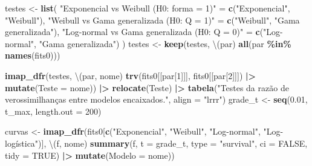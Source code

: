 \documentclass[
  brazilian,
]{article}
\newenvironment{Shaded}{\begin{snugshade}}{\end{snugshade}}
\newcommand{\AttributeTok}[1]{\textcolor[rgb]{0.13,0.29,0.53}{#1}}
\newcommand{\ConstantTok}[1]{\textcolor[rgb]{0.56,0.35,0.01}{#1}}
\newcommand{\DecValTok}[1]{\textcolor[rgb]{0.00,0.00,0.81}{#1}}
\newcommand{\FloatTok}[1]{\textcolor[rgb]{0.00,0.00,0.81}{#1}}
\newcommand{\FunctionTok}[1]{\textcolor[rgb]{0.13,0.29,0.53}{\textbf{#1}}}
\newcommand{\NormalTok}[1]{#1}
\newcommand{\OtherTok}[1]{\textcolor[rgb]{0.56,0.35,0.01}{#1}}
\newcommand{\SpecialCharTok}[1]{\textcolor[rgb]{0.81,0.36,0.00}{\textbf{#1}}}
\newcommand{\StringTok}[1]{\textcolor[rgb]{0.31,0.60,0.02}{#1}}
\begin{document}
\begin{Shaded}
\begin{Highlighting}[]
\NormalTok{testes }\OtherTok{\textless{}{-}} \FunctionTok{list}\NormalTok{(}
  \StringTok{"Exponencial vs Weibull (H0: forma = 1)"} \OtherTok{=} \FunctionTok{c}\NormalTok{(}\StringTok{"Exponencial"}\NormalTok{, }\StringTok{"Weibull"}\NormalTok{),}
  \StringTok{"Weibull vs Gama generalizada (H0: Q = 1)"} \OtherTok{=} \FunctionTok{c}\NormalTok{(}\StringTok{"Weibull"}\NormalTok{, }\StringTok{"Gama generalizada"}\NormalTok{),}
  \StringTok{"Log{-}normal vs Gama generalizada (H0: Q = 0)"} \OtherTok{=} \FunctionTok{c}\NormalTok{(}\StringTok{"Log{-}normal"}\NormalTok{, }\StringTok{"Gama generalizada"}\NormalTok{)}
\NormalTok{)}
\NormalTok{testes }\OtherTok{\textless{}{-}} \FunctionTok{keep}\NormalTok{(testes, \textbackslash{}(par) }\FunctionTok{all}\NormalTok{(par }\SpecialCharTok{\%in\%} \FunctionTok{names}\NormalTok{(fits0)))}

\FunctionTok{imap\_dfr}\NormalTok{(testes, \textbackslash{}(par, nome) }\FunctionTok{trv}\NormalTok{(fits0[[par[}\DecValTok{1}\NormalTok{]]], fits0[[par[}\DecValTok{2}\NormalTok{]]]) }\SpecialCharTok{|\textgreater{}} \FunctionTok{mutate}\NormalTok{(}\AttributeTok{Teste =}\NormalTok{ nome)) }\SpecialCharTok{|\textgreater{}}
  \FunctionTok{relocate}\NormalTok{(Teste) }\SpecialCharTok{|\textgreater{}}
  \FunctionTok{tabela}\NormalTok{(}\StringTok{"Testes da razão de verossimilhanças entre modelos encaixados."}\NormalTok{, }\AttributeTok{align =} \StringTok{"lrrr"}\NormalTok{)}
\NormalTok{grade\_t }\OtherTok{\textless{}{-}} \FunctionTok{seq}\NormalTok{(}\FloatTok{0.01}\NormalTok{, t\_max, }\AttributeTok{length.out =} \DecValTok{200}\NormalTok{)}

\NormalTok{curvas }\OtherTok{\textless{}{-}} \FunctionTok{imap\_dfr}\NormalTok{(fits0[}\FunctionTok{c}\NormalTok{(}\StringTok{"Exponencial"}\NormalTok{, }\StringTok{"Weibull"}\NormalTok{, }\StringTok{"Log{-}normal"}\NormalTok{, }\StringTok{"Log{-}logística"}\NormalTok{)],}
\NormalTok{                   \textbackslash{}(f, nome) }\FunctionTok{summary}\NormalTok{(f, }\AttributeTok{t =}\NormalTok{ grade\_t, }\AttributeTok{type =} \StringTok{"survival"}\NormalTok{, }\AttributeTok{ci =} \ConstantTok{FALSE}\NormalTok{, }\AttributeTok{tidy =} \ConstantTok{TRUE}\NormalTok{) }\SpecialCharTok{|\textgreater{}}
                     \FunctionTok{mutate}\NormalTok{(}\AttributeTok{Modelo =}\NormalTok{ nome))}


\end{Highlighting}
\end{Shaded}
\end{document}
